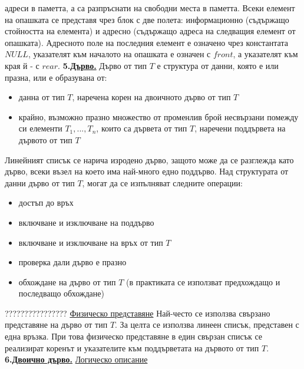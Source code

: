 \documentclass{article}
\begin{document}
адреси в паметта, а са разпръснати на свободни места в паметта. Всеки елемент на опашката се представя чрез блок с две полета:
информационно (съдържащо стойността на елемента) и адресно (съдържащо адреса на следващия елемент от опашката). Адресното поле
на последния елемент е означено чрез константата $NULL$, указателят към началото на опашката е означен с $front$, а указателят
към края й - с $rear$. \newline\newline
\textbf{5.\underline{Дърво.}} \newline\newline
Дърво от тип $T$ е структура от данни, която е или празна, или е образувана от:
\begin{itemize}
    \item данна от тип $T$, наречена корен на двоичното дърво от тип $T$
    \item крайно, възможно празно множество от променлив брой несвързани помежду си елементи $T_1,...,T_n$, които са дървета от
    тип $T$, наречени поддървета на дървото от тип $T$
\end{itemize}
Линейният списък се нарича изродено дърво, защото може да се разглежда като дърво, всеки възел на което има най-много едно поддърво.
Над структурата от данни дърво от тип $T$, могат да се изпълняват следните операции:
\begin{itemize}
    \item достъп до връх
    \item включване и изключване на поддърво
    \item включване и изключване на връх от тип $T$
    \item проверка дали дърво е празно
    \item обхождане на дърво от тип $T$ (в практиката се използват предхождащо и последващо обхождане)
\end{itemize}
????????????????
\underline{Физическо представяне} \newline
Най-често се използва свързано представяне на дърво от тип $T$. За целта се използва линеен списък, представен с една връзка.
При това физическо представяне в един свързан списък се реализират коренът и указателите към поддърветата на дървото от тип $T$. \newline\newline
\textbf{6.\underline{Двоично дърво.}} \newline\newline
\underline{Логическо описание} \newline
\end{document}
